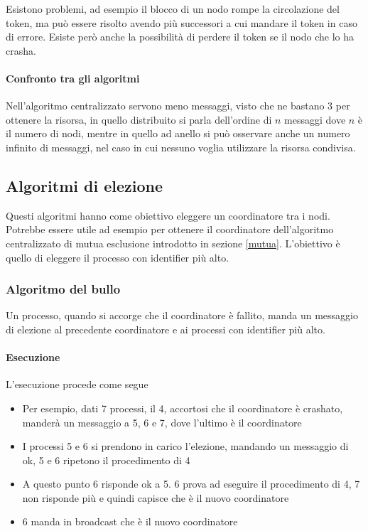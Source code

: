 Esistono problemi, ad esempio il blocco di un nodo 
rompe la circolazione del token, ma può essere risolto avendo più 
successori a cui mandare il token in caso di errore. Esiste però 
anche la possibilità di perdere il token se il nodo che lo ha crasha.

\paragraph{Confronto tra gli algoritmi}
Nell'algoritmo centralizzato servono meno messaggi, visto che ne bastano 
3 per ottenere la risorsa, in quello distribuito si parla 
dell'ordine di $n$ messaggi dove $n$ è il numero di nodi, 
mentre in quello ad anello si può osservare anche un numero 
infinito di messaggi, nel caso in cui nessuno voglia utilizzare 
la risorsa condivisa.

\subsection{Algoritmi di elezione}
Questi algoritmi hanno come obiettivo eleggere un coordinatore 
tra i nodi. 
Potrebbe essere utile ad esempio per ottenere il coordinatore dell'algoritmo 
centralizzato di mutua esclusione introdotto in sezione \vref{mutua}.
L'obiettivo è quello di eleggere il processo con identifier più alto.

\subsubsection{Algoritmo del bullo}
Un processo, quando si accorge che il coordinatore 
è fallito, manda un messaggio di elezione 
al precedente coordinatore e ai processi con identifier più alto.

\paragraph{Esecuzione}
L'esecuzione procede come segue 
\begin{itemize}
    \item Per esempio, dati 7 processi, il 4, accortosi che il coordinatore 
    è crashato, manderà un messaggio a 5, 6 e 7, dove l'ultimo è il coordinatore
    \item I processi 5 e 6 si prendono in carico l'elezione, 
    mandando un messaggio di ok, 5 e 6 ripetono il procedimento 
    di 4
    \item A questo punto 6 risponde ok a 5.
    6 prova ad eseguire il procedimento di 4, 7 non risponde più
    e quindi capisce che è il nuovo coordinatore
    \item 6 manda in broadcast che è il nuovo coordinatore
\end{itemize}

